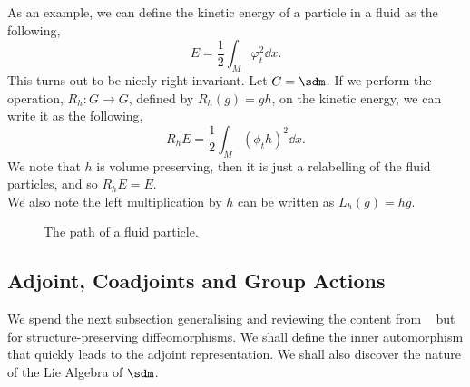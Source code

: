 \noindent
As an example, we can define the kinetic energy of a particle in a fluid as the following,
$$ E = \frac{1}{2}\int_M \varphi_t^2 \dd x. $$
This turns out to be nicely right invariant. Let $G = \sdm$. If we perform the operation, $R_h : G \to G$, defined by $R_h(g) = gh$, on the kinetic energy, we can write it as the following,
$$ R_hE = \frac{1}{2}\int_M (\phi_t h)^2 \dd x. $$
We note that $h$ is volume preserving, then it is just a relabelling of the fluid particles, and so $R_hE = E$.\\

\noindent
We also note the left multiplication by $h$ can be written as $L_h(g) = hg$.

\begin{figure}[!ht]
\centering
\resizebox{0.6\textwidth}{!}{}
\caption{The path of a fluid particle.}
\label{fig:diffeos}
\end{figure}

\subsection{Adjoint, Coadjoints and Group Actions}
We spend the next subsection generalising and reviewing the content from ~\cite{arthur} but for structure-preserving diffeomorphisms. We shall define the inner automorphism that quickly leads to the adjoint representation. We shall also discover the nature of the Lie Algebra of $\sdm$.\\

